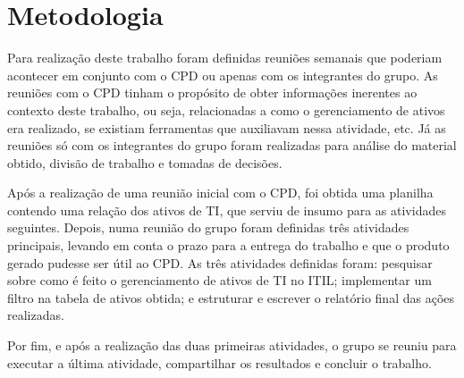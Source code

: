 \chapter{Metodologia}
Para realização deste trabalho foram definidas reuniões semanais que poderiam acontecer em conjunto com o CPD ou apenas com os integrantes do grupo. As reuniões com o CPD tinham o propósito de obter informações inerentes ao contexto deste trabalho, ou seja, relacionadas a como o gerenciamento de ativos era realizado, se existiam ferramentas que auxiliavam nessa atividade, etc. Já as reuniões só com os integrantes do grupo foram realizadas para análise do material obtido, divisão de trabalho e tomadas de decisões.

Após a realização de uma reunião inicial com o CPD, foi obtida uma planilha contendo uma relação dos ativos de TI, que serviu de insumo para as atividades seguintes. Depois, numa reunião do grupo foram definidas três atividades principais, levando em conta o prazo para a entrega do trabalho e que o produto gerado pudesse ser útil ao CPD. As três atividades definidas foram: pesquisar sobre como é feito o gerenciamento de ativos de TI no ITIL; implementar um filtro na tabela de ativos obtida; e estruturar e escrever o relatório final das ações realizadas.

Por fim, e após a realização das duas primeiras atividades, o grupo se reuniu para executar a última atividade, compartilhar os resultados e concluir o trabalho.